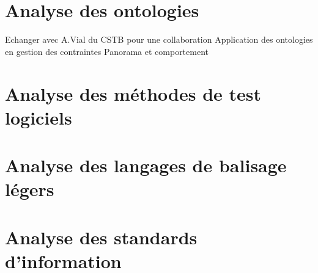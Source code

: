 \documentclass[a4paper,12pt]{article}
\begin{document}
\section{Analyse des ontologies}
\label{sec:org95edfbc}
Echanger avec A.Vial du CSTB pour une collaboration
Application des ontologies en gestion des contraintes
Panorama et comportement
\section{Analyse des méthodes de test logiciels}
\label{sec:org320ffb1}
\section{Analyse des langages de balisage légers}
\label{sec:orgb67cbdf}
\section{Analyse des standards d'information}
\label{sec:org993cdbc}
\clearpage
\end{document}
